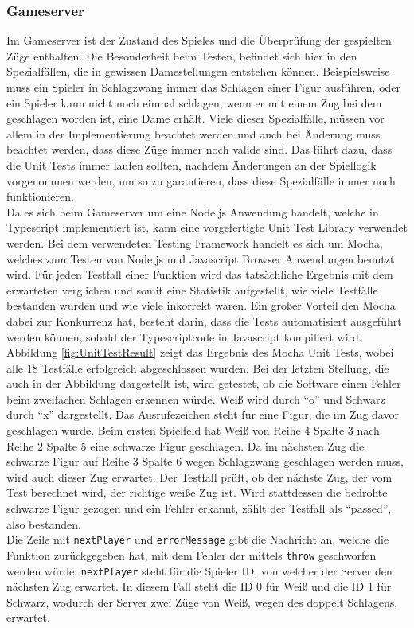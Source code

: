 \documentclass[12pt,a4paper,bibliography=totocnumbered,listof=totocnumbered]{article}
\begin{document}
\subsubsection{Gameserver}
Im Gameserver ist der Zustand des Spieles und die Überprüfung der gespielten Züge enthalten. 
Die Besonderheit beim Testen, befindet sich hier in den Spezialfällen, die in gewissen Damestellungen entstehen können. Beispielsweise muss ein
Spieler in Schlagzwang immer das Schlagen einer Figur ausführen, oder ein Spieler kann nicht noch einmal schlagen, wenn er mit einem Zug bei dem geschlagen worden ist,
eine Dame erhält. Viele dieser Spezialfälle, müssen vor allem in der Implementierung beachtet werden und auch bei Änderung muss beachtet werden, dass 
diese Züge immer noch valide sind. Das führt dazu, dass die Unit Tests immer laufen sollten, nachdem Änderungen an der Spiellogik vorgenommen werden,
um so zu garantieren, dass diese Spezialfälle immer noch funktionieren.
\\
Da es sich beim Gameserver um eine Node.js Anwendung handelt, welche in Typescript implementiert ist, kann eine vorgefertigte Unit Test Library verwendet werden.
Bei dem verwendeten Testing Framework handelt es sich um Mocha, welches zum Testen von Node.js und Javascript Browser Anwendungen benutzt wird. 
Für jeden Testfall einer Funktion wird das tatsächliche Ergebnis mit dem erwarteten verglichen und somit eine Statistik aufgestellt, wie viele Testfälle 
bestanden wurden und wie viele inkorrekt waren. Ein großer Vorteil den Mocha dabei zur Konkurrenz hat, besteht darin, dass die Tests automatisiert ausgeführt werden 
können, sobald der Typescriptcode in Javascript kompiliert wird.
\\ 
Abbildung \ref{fig:UnitTestResult} zeigt das Ergebnis des Mocha Unit Tests, wobei alle 18 Testfälle erfolgreich abgeschlossen wurden.
Bei der letzten Stellung, die auch in der Abbildung dargestellt ist, wird getestet, ob die Software einen Fehler beim zweifachen Schlagen erkennen würde.
Weiß wird durch ``o'' und Schwarz durch ``x'' dargestellt. Das Ausrufezeichen steht für eine Figur, die im Zug davor geschlagen wurde. 
Beim ersten Spielfeld hat Weiß von Reihe 4 Spalte 3 nach Reihe 2 Spalte 5 eine schwarze Figur geschlagen. Da im nächsten Zug die schwarze Figur auf 
Reihe 3 Spalte 6 wegen Schlagzwang geschlagen werden muss, wird auch dieser Zug erwartet. Der Testfall prüft, ob der nächste Zug, der 
vom Test berechnet wird, der richtige weiße Zug ist. Wird stattdessen die bedrohte schwarze Figur gezogen und ein Fehler erkannt, zählt der Testfall als ``passed'', also bestanden.
\\
Die Zeile mit \texttt{nextPlayer} und \texttt{errorMessage} gibt die Nachricht an, welche die Funktion zurückgegeben hat, mit dem Fehler der
mittels \texttt{throw} geschworfen werden würde. \texttt{nextPlayer} steht für die Spieler ID, von welcher der Server den nächsten Zug erwartet.
In diesem Fall steht die ID 0 für Weiß und die ID 1 für Schwarz, wodurch der Server zwei Züge von Weiß, wegen des doppelt Schlagens, erwartet.
\end{document}
